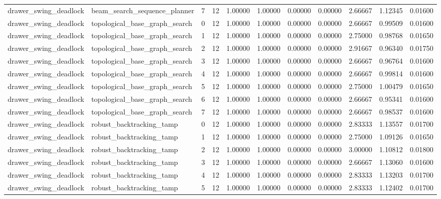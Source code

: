 \documentclass{article}
\begin{document}
\begin{table}[tbp]
{\begin{tabular}{lllllllllll}
drawer\_swing\_deadlock & beam\_search\_sequence\_planner & 7 & 12 & 1.00000 & 1.00000 & 0.00000 & 0.00000 & 2.66667 & 1.12345 & 0.01600 \\
drawer\_swing\_deadlock & topological\_base\_graph\_search & 0 & 12 & 1.00000 & 1.00000 & 0.00000 & 0.00000 & 2.66667 & 0.99509 & 0.01600 \\
drawer\_swing\_deadlock & topological\_base\_graph\_search & 1 & 12 & 1.00000 & 1.00000 & 0.00000 & 0.00000 & 2.75000 & 0.98768 & 0.01650 \\
drawer\_swing\_deadlock & topological\_base\_graph\_search & 2 & 12 & 1.00000 & 1.00000 & 0.00000 & 0.00000 & 2.91667 & 0.96340 & 0.01750 \\
drawer\_swing\_deadlock & topological\_base\_graph\_search & 3 & 12 & 1.00000 & 1.00000 & 0.00000 & 0.00000 & 2.66667 & 0.96764 & 0.01600 \\
drawer\_swing\_deadlock & topological\_base\_graph\_search & 4 & 12 & 1.00000 & 1.00000 & 0.00000 & 0.00000 & 2.66667 & 0.99814 & 0.01600 \\
drawer\_swing\_deadlock & topological\_base\_graph\_search & 5 & 12 & 1.00000 & 1.00000 & 0.00000 & 0.00000 & 2.75000 & 1.00479 & 0.01650 \\
drawer\_swing\_deadlock & topological\_base\_graph\_search & 6 & 12 & 1.00000 & 1.00000 & 0.00000 & 0.00000 & 2.66667 & 0.95341 & 0.01600 \\
drawer\_swing\_deadlock & topological\_base\_graph\_search & 7 & 12 & 1.00000 & 1.00000 & 0.00000 & 0.00000 & 2.66667 & 0.98537 & 0.01600 \\
drawer\_swing\_deadlock & robust\_backtracking\_tamp & 0 & 12 & 1.00000 & 1.00000 & 0.00000 & 0.00000 & 2.83333 & 1.13557 & 0.01700 \\
drawer\_swing\_deadlock & robust\_backtracking\_tamp & 1 & 12 & 1.00000 & 1.00000 & 0.00000 & 0.00000 & 2.75000 & 1.09126 & 0.01650 \\
drawer\_swing\_deadlock & robust\_backtracking\_tamp & 2 & 12 & 1.00000 & 1.00000 & 0.00000 & 0.00000 & 3.00000 & 1.10812 & 0.01800 \\
drawer\_swing\_deadlock & robust\_backtracking\_tamp & 3 & 12 & 1.00000 & 1.00000 & 0.00000 & 0.00000 & 2.66667 & 1.13060 & 0.01600 \\
drawer\_swing\_deadlock & robust\_backtracking\_tamp & 4 & 12 & 1.00000 & 1.00000 & 0.00000 & 0.00000 & 2.83333 & 1.13203 & 0.01700 \\
drawer\_swing\_deadlock & robust\_backtracking\_tamp & 5 & 12 & 1.00000 & 1.00000 & 0.00000 & 0.00000 & 2.83333 & 1.12402 & 0.01700 \\

\end{tabular}}
\end{table}
\end{document}
